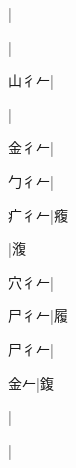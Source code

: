 \begin{multicols}{2}
{{}|{}\par
{}|{}\par
{\cjk{}山{彳}{\cnxHanaA{}𠂉}}|{}\par
{}|{}\par
{\cjk{}金{彳}{\cnxHanaA{}𠂉}}|{}\par
{\cjk{}勹{彳}{\cnxHanaA{}𠂉}}|{}\par
{\cjk{}疒{彳}{\cnxHanaA{}𠂉}}|{\cjk{}癁}\par
{}|{\cjk{}澓}\par
{\cjk{}穴{彳}{\cnxHanaA{}𠂉}}|{}\par
{\cjk{}尸{彳}{\cnxHanaA{}𠂉}}|{\cjk{}履}\par
{\cjk{}尸{彳}{\cnxHanaA{}𠂉}}|{}\par
{\cjk{}{\cnsym{}　}金{\cnxHanaA{}𠂉}}|{\cjk{}鍑}\par
{}|{}\par
{}|{}\par
}
\end{multicols}
